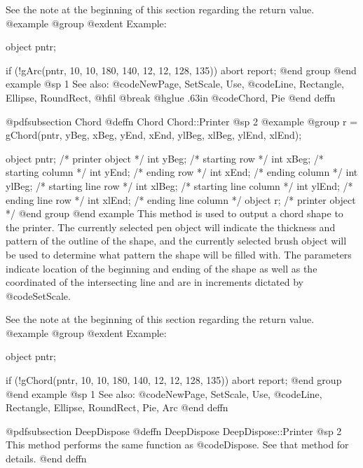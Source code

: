 See the note at the beginning of this section regarding the return value.
@example
@group
@exdent Example:

object  pntr;

if (!gArc(pntr, 10, 10, 180, 140, 12, 12, 128, 135))
        abort report;
@end group
@end example
@sp 1
See also:  @code{NewPage, SetScale, Use,}
        @code{Line, Rectangle, Ellipse, RoundRect,}
@hfil @break @hglue .63in @code{Chord, Pie}
@end deffn












@pdfsubsection {Chord}
@deffn {Chord} Chord::Printer
@sp 2
@example
@group
r = gChord(pntr, yBeg, xBeg, yEnd, xEnd,
                 ylBeg, xlBeg, ylEnd, xlEnd);

object  pntr;   /*  printer object         */
int     yBeg;   /*  starting row           */
int     xBeg;   /*  starting column        */
int     yEnd;   /*  ending row             */
int     xEnd;   /*  ending column          */
int     ylBeg;  /*  starting line row      */
int     xlBeg;  /*  starting line column   */
int     ylEnd;  /*  ending line row        */
int     xlEnd;  /*  ending line column     */
object  r;      /*  printer object         */
@end group
@end example
This method is used to output a chord shape to the printer.  The
currently selected pen object will indicate the thickness and pattern of
the outline of the shape, and the currently selected brush object will
be used to determine what pattern the shape will be filled with.  The
parameters indicate location of the beginning and ending of the shape as
well as the coordinated of the intersecting line and are in increments
dictated by @code{SetScale}.

See the note at the beginning of this section regarding the return value.
@example
@group
@exdent Example:

object  pntr;

if (!gChord(pntr, 10, 10, 180, 140, 12, 12, 128, 135))
        abort report;
@end group
@end example
@sp 1
See also:  @code{NewPage, SetScale, Use,}
        @code{Line, Rectangle, Ellipse, RoundRect, Pie, Arc}
@end deffn








@pdfsubsection {DeepDispose}
@deffn {DeepDispose} DeepDispose::Printer
@sp 2
This method performs the same function as @code{Dispose}.  See that
method for details.
@end deffn





